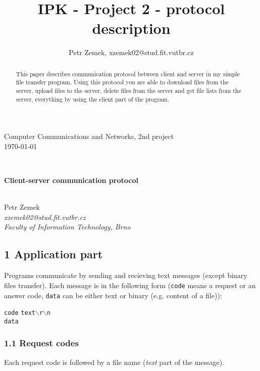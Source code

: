 \documentclass[11pt,a4paper]{article}
\title{IPK - Project 2 - protocol description}
\author{Petr Zemek, xzemek02@stud.fit.vutbr.cz}
\newcommand{\bs}{$\backslash$}
\begin{document}
\pagestyle{empty}

\noindent
\begin{small}Computer Communications and Networks, 2nd project \\ \today\end{small} \\

\begin{center}
	\begin{large}\textbf{Client-server communication protocol}\end{large} \\
	\vspace{0.4cm}
	Petr Zemek \\
	\textit{xzemek02@stud.fit.vutbr.cz} \\
	\textit{Faculty of Information Technology, Brno} \\
\end{center}

\noindent
\begin{abstract}
	\noindent
	This paper describes communication protocol between client and server in
	my simple file transfer program. Using this protocol you
	are able to download files from the server, upload files to the server,
	delete files from the server and get file lists from the server, everything
	by using the client part of the program.
\end{abstract}

\subsection*{1 Application part}

Programs communicate by sending and recieving text messages (except binary files transfer).
Each message is in the following form (\texttt{code} means a request or an answer code,
\texttt{data} can be either text or binary (e.g. content of a file)): \\

\par
\begingroup
\leftskip=0.8cm
\noindent
\texttt{code} \texttt{text}\bs \texttt{r}\bs \texttt{n} \\
\texttt{data}
\par
\endgroup

\subsubsection*{1.1 Request codes}
Each request code is followed by a file name (\textit{text} part of the message). \\
\end{document}

